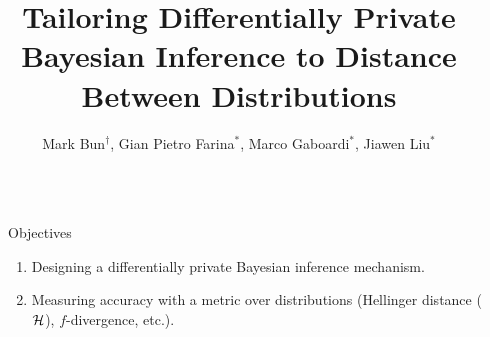 \documentclass[final,hyperref={pdfpagelabels=false}]{beamer}
\title{\LARGE Tailoring Differentially Private Bayesian Inference to Distance Between Distributions} %
\author{Mark Bun$^\dag$,
Gian Pietro Farina$^{*}$,
Marco Gaboardi$^{*}$,
Jiawen Liu$^{*}$
}
\institute{$^\dag$Princeton University, $^{*}$University at Buffalo, SUNY} %
\begin{document}
\begin{frame}[t] %

\begin{columns}[t] %

\begin{column}{.015\textwidth}\end{column} %

\begin{column}{.485\textwidth} %


\begin{block}{Objectives}
\begin{enumerate}
\item Designing a differentially private Bayesian inference mechanism.
\item Measuring accuracy with a metric over distributions (Hellinger distance ($\mathcal{H}$), $f$-divergence, etc.).
\end{enumerate}


\end{block}
\end{column}
\end{columns}
\end{frame}
\end{document}

